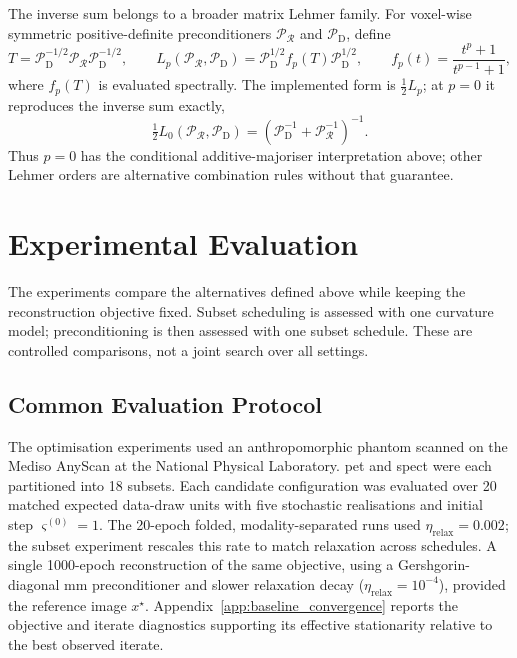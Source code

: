 The inverse sum belongs to a broader matrix Lehmer family. For voxel-wise symmetric positive-definite preconditioners $\mathcal{P}_{\mathcal R}$ and $\mathcal{P}_{\mathrm D}$, define
\begin{equation}
    T=\mathcal{P}_{\mathrm D}^{-1/2}\mathcal{P}_{\mathcal R}\mathcal{P}_{\mathrm D}^{-1/2},
    \qquad
    L_p(\mathcal{P}_{\mathcal R},\mathcal{P}_{\mathrm D})
    =\mathcal{P}_{\mathrm D}^{1/2}f_p(T)\mathcal{P}_{\mathrm D}^{1/2},
    \qquad
    f_p(t)=\frac{t^p+1}{t^{p-1}+1},
    \label{eq:matrix_lehmer_combination}
\end{equation}
where $f_p(T)$ is evaluated spectrally. The implemented form is $\tfrac12L_p$; at $p=0$ it reproduces the inverse sum exactly,
\begin{equation}
    \tfrac12L_0(\mathcal{P}_{\mathcal R},\mathcal{P}_{\mathrm D})
    =
    \left(\mathcal{P}_{\mathrm D}^{-1}+\mathcal{P}_{\mathcal R}^{-1}\right)^{-1}.
    \label{eq:lehmer_parallel_equivalence}
\end{equation}
Thus $p=0$ has the conditional additive-majoriser interpretation above; other Lehmer orders are alternative combination rules without that guarantee.

\section{Experimental Evaluation}
\label{sec:optimisation_experiments}

The experiments compare the alternatives defined above while keeping the reconstruction objective fixed. Subset scheduling is assessed with one curvature model; preconditioning is then assessed with one subset schedule. These are controlled comparisons, not a joint search over all settings.

\subsection{Common Evaluation Protocol}
\label{subsec:optimisation_evaluation_protocol}

The optimisation experiments used an anthropomorphic phantom scanned on the Mediso AnyScan at the National Physical Laboratory. \gls{pet} and \gls{spect} were each partitioned into 18 subsets. Each candidate configuration was evaluated over 20 matched expected data-draw units with five stochastic realisations and initial step $\varsigma^{(0)}=1$. The 20-epoch folded, modality-separated runs used $\eta_{\mathrm{relax}}=0.002$; the subset experiment rescales this rate to match relaxation across schedules. A single 1000-epoch reconstruction of the same objective, using a Gershgorin-diagonal \gls{mm} preconditioner and slower relaxation decay ($\eta_{\mathrm{relax}}=10^{-4}$), provided the reference image $x^\star$. Appendix~\ref{app:baseline_convergence} reports the objective and iterate diagnostics supporting its effective stationarity relative to the best observed iterate.

